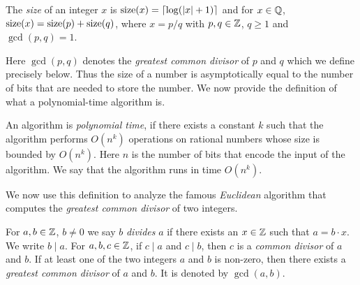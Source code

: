 \begin{definition}
  \label{def:2}
  The \emph{size} of an integer $x$
  is $\operatorname{size}(x) = \lceil\log( |x| +1)\rceil$
  and for $x \in \mathbb{Q}$,
  $\operatorname{size}(x) = \operatorname{size}(p)+\operatorname{size}(q)$,
  where $x = p/q$ with $p,q \in \mathbb{Z}$, $q\geq1$ and $\gcd(p,q)=1$.   
\end{definition}
Here $\gcd(p,q)$ denotes the \emph{greatest common divisor} of $p$ and $q$ which we define precisely below. 
Thus the size of a number is asymptotically equal to the number of
bits that are needed to store the number.  We now provide the
definition of what a polynomial-time algorithm is.
\begin{definition}
  \label{def:1}
  An algorithm is \emph{polynomial time}, if there exists a
  constant $k$
  such that the algorithm performs $O(n^k)$
  operations on rational numbers whose size is bounded by
  $O(n^k)$.
  Here $n$
  is the number of bits that encode the input of the algorithm. We say that the algorithm runs in time $O(n^k)$. 
\end{definition}

We now use this definition to analyze the famous \emph{Euclidean} algorithm that computes the \emph{greatest common divisor} of two integers. 

 For $a,b \in \mathbb{Z}$, $b \neq0$ we say $b$ \emph{divides} $a$ if there
    exists an $x \in \mathbb{Z}$ such that $a = b \cdot  x$. We 
    write    $b\mid a$.  
   For $a,b,c \in \mathbb{Z}$, if $c\mid a$ and $c\mid b$, then $c$ is a
    \emph{common divisor} of $a$ and $b$. 
    If at least one of the two integers $a$ and $b$ is non-zero,
    then there exists a \emph{greatest common divisor} of $a$ and
    $b$. It is denoted by \emph{$\gcd(a,b)$}. 
    

